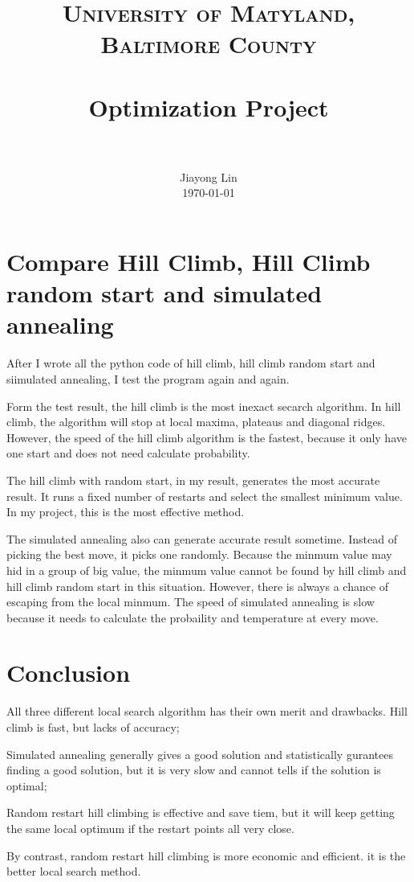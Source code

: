 \documentclass[paper=a4, fontsize=12pt]{report}
\title{
		\usefont{OT1}{bch}{b}{n}
		\normalfont \normalsize \textsc{University of Matyland, Baltimore County} \\ [25pt]
		\horrule{0.5pt} \\[0.4cm]
		\huge Optimization Project \\
		\horrule{2pt} \\[0.5cm]
}
\author{
		\normalfont 								\normalsize
        Jiayong Lin\\[-3pt]		\normalsize
        \today
}
\date{}
\numberwithin{equation}{section}		%
\numberwithin{figure}{section}			%
\numberwithin{table}{section}				%
\begin{document}
\maketitle
\section{Compare Hill Climb, Hill Climb random start and simulated annealing}
After I wrote all the python code of hill climb, hill climb random start and siimulated annealing, I test the program again and again. 

Form the test result, the hill climb is the most inexact secarch algorithm. In hill climb, the algorithm will stop at local maxima, plateaus and diagonal ridges. However, the speed of the hill climb algorithm is the fastest, because it only have one start and does not need calculate probability. 

The hill climb with random start, in my result, generates the most accurate result. It runs a fixed number of restarts and select the smallest minimum value. In my project, this is the most effective method. 

The simulated annealing also can generate accurate result sometime. Instead of picking the best move, it picks one randomly. Because the minmum value may hid in a group of big value, the minmum value cannot be found by hill climb and hill climb random start in this situation. However, there is always a chance of escaping from the local minmum. The speed of simulated annealing is slow because it needs to calculate the probaility and temperature at every move. 






\section{Conclusion}
   All three different local search algorithm has their own merit and drawbacks. Hill climb is fast, but lacks of accuracy; 
   
   Simulated annealing generally gives a good solution and statistically gurantees finding a good solution, but it is very slow and cannot tells if the solution is optimal;
   
   Random restart hill climbing is effective and save tiem, but it will keep getting the same local optimum if the restart points all very close.

By contrast, random restart hill climbing is more economic and efficient. it is the better local search method. 
\end{document}
